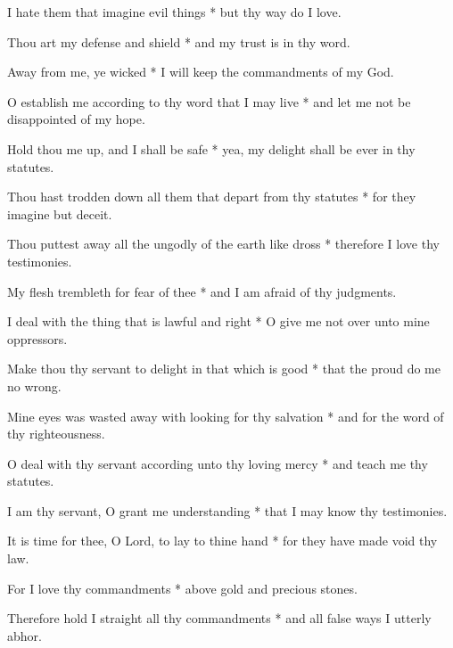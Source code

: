 I hate them that imagine evil things * but thy way do I love.

Thou art my defense and shield * and my trust is in thy word.

Away from me, ye wicked * I will keep the commandments of my God.

O establish me according to thy word that I may live * and let me not be disappointed of my hope.

Hold thou me up, and I shall be safe * yea, my delight shall be ever in thy statutes.

Thou hast trodden down all them that depart from thy statutes * for they imagine but deceit.

Thou puttest away all the ungodly of the earth like dross * therefore I love thy testimonies.

My flesh trembleth for fear of thee * and I am afraid of thy judgments.

I deal with the thing that is lawful and right * O give me not over unto mine oppressors.

Make thou thy servant to delight in that which is good * that the proud do me no wrong.

Mine eyes was wasted away with looking for thy salvation * and for the word of thy righteousness.

O deal with thy servant according unto thy loving mercy * and teach me thy statutes.

I am thy servant, O grant me understanding * that I may know thy testimonies.

It is time for thee, O Lord, to lay to thine hand * for they have made void thy law.

For I love thy commandments * above gold and precious stones.

Therefore hold I straight all thy commandments * and all false ways I utterly abhor. 